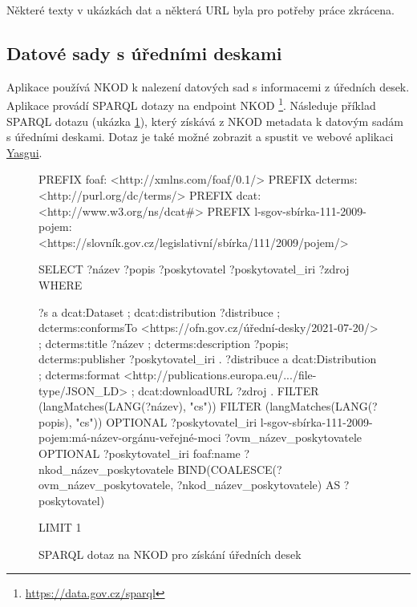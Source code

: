 Některé texty v ukázkách dat a některá URL byla pro potřeby práce zkrácena.

\subsection{Datové sady s úředními deskami}

Aplikace používá NKOD k nalezení datových sad s informacemi z úředních desek. Aplikace provádí SPARQL dotazy na endpoint NKOD \footnote{\url{https://data.gov.cz/sparql}}. Následuje příklad SPARQL dotazu (ukázka \ref{code:nkod-dotaz}), který získává z NKOD metadata k datovým sadám s úředními deskami. Dotaz je také možné zobrazit a spustit ve webové aplikaci \href{https://api.triplydb.com/s/aey-LUG7p}{Yasgui}.


\begin{figure}[h]
    \label{code:nkod-dotaz}
    \begin{code}

PREFIX foaf: <http://xmlns.com/foaf/0.1/>
PREFIX dcterms: <http://purl.org/dc/terms/>
PREFIX dcat: <http://www.w3.org/ns/dcat#>
PREFIX l-sgov-sbírka-111-2009-pojem:
<https://slovník.gov.cz/legislativní/sbírka/111/2009/pojem/>

SELECT  ?název ?popis ?poskytovatel ?poskytovatel_iri ?zdroj
WHERE {
    ?s a dcat:Dataset ;
        dcat:distribution ?distribuce ;
        dcterms:conformsTo 
            <https://ofn.gov.cz/úřední-desky/2021-07-20/> ;
        dcterms:title ?název ;
        dcterms:description ?popis;
        dcterms:publisher ?poskytovatel_iri .
    ?distribuce a dcat:Distribution ;
        dcterms:format
            <http://publications.europa.eu/.../file-type/JSON_LD> ;
        dcat:downloadURL ?zdroj .
  FILTER (langMatches(LANG(?název), "cs"))
  FILTER (langMatches(LANG(?popis), "cs"))
  OPTIONAL {
       ?poskytovatel_iri
       l-sgov-sbírka-111-2009-pojem:má-název-orgánu-veřejné-moci
           ?ovm_název_poskytovatele 
  }
  OPTIONAL {
       ?poskytovatel_iri foaf:name ?nkod_název_poskytovatele
  }
  BIND(COALESCE(?ovm_název_poskytovatele, ?nkod_název_poskytovatele)
    AS ?poskytovatel)

}
LIMIT 1
\end{code}
\caption{SPARQL dotaz na NKOD pro získání úředních desek}
\end{figure}



